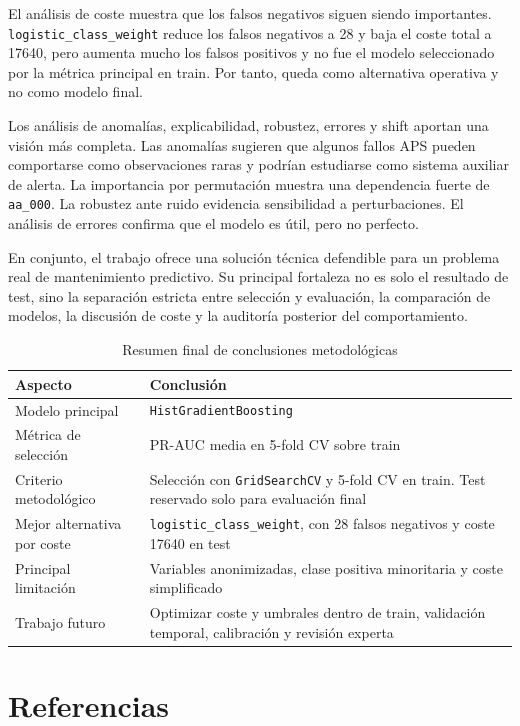 \documentclass[11pt,a4paper]{article}
\begin{document}
El análisis de coste muestra que los falsos negativos siguen siendo importantes. \texttt{logistic\_class\_weight} reduce los falsos negativos a 28 y baja el coste total a 17640, pero aumenta mucho los falsos positivos y no fue el modelo seleccionado por la métrica principal en train. Por tanto, queda como alternativa operativa y no como modelo final.

Los análisis de anomalías, explicabilidad, robustez, errores y shift aportan una visión más completa. Las anomalías sugieren que algunos fallos APS pueden comportarse como observaciones raras y podrían estudiarse como sistema auxiliar de alerta. La importancia por permutación muestra una dependencia fuerte de \texttt{aa\_000}. La robustez ante ruido evidencia sensibilidad a perturbaciones. El análisis de errores confirma que el modelo es útil, pero no perfecto.

En conjunto, el trabajo ofrece una solución técnica defendible para un problema real de mantenimiento predictivo. Su principal fortaleza no es solo el resultado de test, sino la separación estricta entre selección y evaluación, la comparación de modelos, la discusión de coste y la auditoría posterior del comportamiento.

\begin{table}[H]
\centering
\caption{Resumen final de conclusiones metodológicas}
\label{tab_conclusiones_metodologicas}
\small
\begin{tabular}{@{}p{}p{}@{}}
\toprule
\textbf{Aspecto} & \textbf{Conclusión}\\
\midrule
Modelo principal & \texttt{HistGradientBoosting}\\
Métrica de selección & PR-AUC media en 5-fold CV sobre train\\
Criterio metodológico & Selección con \texttt{GridSearchCV} y 5-fold CV en train. Test reservado solo para evaluación final\\
Mejor alternativa por coste & \texttt{logistic\_class\_weight}, con 28 falsos negativos y coste 17640 en test\\
Principal limitación & Variables anonimizadas, clase positiva minoritaria y coste simplificado\\
Trabajo futuro & Optimizar coste y umbrales dentro de train, validación temporal, calibración y revisión experta\\
\bottomrule
\end{tabular}
\end{table}

\section{Referencias}
\label{sec_referencias}
\end{document}
